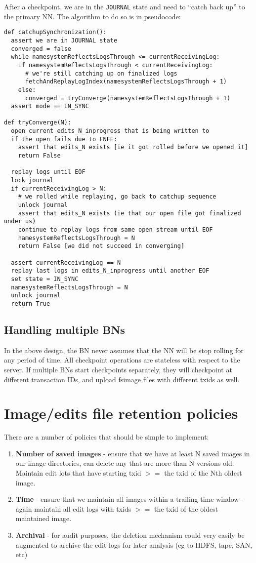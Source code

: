 \documentclass{article}
\begin{document}
After a checkpoint, we are in the {\tt JOURNAL} state and need to ``catch back up'' to the primary NN. The algorithm to do so is in pseudocode:
\label{catchupSynchronization}
\begin{verbatim}
def catchupSynchronization():
  assert we are in JOURNAL state
  converged = false
  while namesystemReflectsLogsThrough <= currentReceivingLog:
    if namesystemReflectsLogsThrough < currentReceivingLog:
      # we're still catching up on finalized logs
      fetchAndReplayLogIndex(namesystemReflectsLogsThrough + 1)
    else:
      converged = tryConverge(namesystemReflectsLogsThrough + 1)
  assert mode == IN_SYNC

def tryConverge(N):
  open current edits_N_inprogress that is being written to
  if the open fails due to FNFE:
    assert that edits_N exists [ie it got rolled before we opened it]
    return False

  replay logs until EOF
  lock journal
  if currentReceivingLog > N:
    # we rolled while replaying, go back to catchup sequence
    unlock journal
    assert that edits_N exists (ie that our open file got finalized under us)
    continue to replay logs from same open stream until EOF
    namesystemReflectsLogsThrough = N
    return False [we did not succeed in converging]

  assert currentReceivingLog == N
  replay last logs in edits_N_inprogress until another EOF
  set state = IN_SYNC
  namesystemReflectsLogsThrough = N
  unlock journal
  return True
\end{verbatim}

\subsection{Handling multiple BNs}

In the above design, the BN never assumes that the NN will be stop rolling for any period of time. All checkpoint operations are stateless with respect to the server. If multiple BNs start checkpoints separately, they will checkpoint at different transaction IDs, and upload fsimage files with different txids as well.

\section{Image/edits file retention policies}

There are a number of policies that should be simple to implement:
\begin{enumerate}
\item {\bf Number of saved images} - ensure that we have at least N saved images in our image directories, can delete any that are more than N versions old. Maintain edit lots that have starting txid $>=$ the txid of the Nth oldest image.
\item {\bf Time} - ensure that we maintain all images within a trailing time window - again maintain all edit logs with txids $>=$ the txid of the oldest maintained image.
\item {\bf Archival} - for audit purposes, the deletion mechanism could very easily be augmented to archive the edit logs for later analysis (eg to HDFS, tape, SAN, etc)
\end{enumerate}
\end{document}
